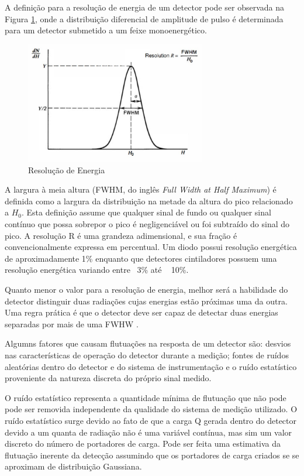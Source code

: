 \documentclass[11pt,a4paper]{article}
\begin{document}
		A definição para a resolução de energia de um detector pode ser observada na Figura \ref{fig:resolucaoDeEnergia}, onde a distribuição diferencial de amplitude de pulso é determinada para um detector submetido a um feixe monoenergético. 

			\begin{figure}[h]
				\centering
				\includegraphics[width=0.7\textwidth]{Imagens/resolucaoDeEnergia.jpg}
				\caption{Resolução de Energia}
				\label{fig:resolucaoDeEnergia}
			\end{figure}


		A largura à meia altura (FWHM,  do inglês \textit{Full Width at Half Maximum}) é definida como a largura da distribuição na metade da altura do pico relacionado a $H_0$. Esta definição assume que qualquer sinal de fundo ou qualquer sinal contínuo que possa sobrepor o pico é negligenciável ou foi subtraído do sinal do pico. A resolução R é uma grandeza adimensional, e  sua fração é convencionalmente expressa em percentual. Um diodo possui resolução energética de aproximadamente 1\% enquanto que detectores cintiladores possuem uma resolução energética variando entre ~3\% até ~ 10\%.

		Quanto menor o valor para a resolução de energia, melhor será a habilidade do detector distinguir duas radiações cujas energias estão próximas uma da outra. Uma regra prática é que o detector deve ser capaz de detectar duas energias separadas por mais de uma FWHW .

		Algumns fatores que causam flutuações na resposta de um detector são: desvios nas características de operação do detector durante a medição; fontes de ruídos aleatórias dentro do detector e do sistema de instrumentação e o ruído estatístico proveniente da natureza discreta do próprio sinal medido. 
		
		O ruído estatístico representa a quantidade mínima de flutuação que não pode pode ser removida independente da qualidade do sistema de medição utilizado. O ruído estatístico surge devido ao fato de que a carga Q gerada dentro do detector devido a um quanta de radiação  não é uma variável contínua, mas sim um valor discreto do número de portadores de carga. Pode ser feita uma estimativa da flutuação inerente da detecção assumindo que os portadores de carga criados se se aproximam de distribuição Gaussiana.
\end{document}
